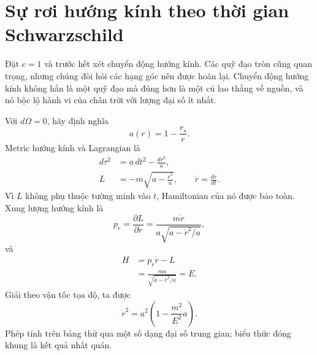 \section{Sự rơi hướng kính theo thời gian Schwarzschild}

Đặt \(c=1\) và trước hết xét chuyển động hướng kính. Các quỹ đạo tròn cũng quan trọng, nhưng chúng đòi hỏi các hạng góc nên được hoãn lại. Chuyển động hướng kính không hẳn là một quỹ đạo mà đúng hơn là một cú lao thẳng về nguồn, và nó bộc lộ hành vi của chân trời với lượng đại số ít nhất.

\begin{classroomqa}
\end{classroomqa}

Với \(d\Omega=0\), hãy định nghĩa
\begin{equation}
a(r)=1-\frac{r_s}{r}.
\label{eq:l5-a-def}
\end{equation}
Metric hướng kính và Lagrangian là
\begin{align}
d\tau^2&=a\,dt^2-\frac{dr^2}{a},\\
L&=-m\sqrt{a-\frac{\dot r^2}{a}},
\qquad
\dot r=\frac{dr}{dt}.
\label{eq:l5-radial-lagrangian}
\end{align}
Vì \(L\) không phụ thuộc tường minh vào \(t\), Hamiltonian của nó được bảo toàn.
Xung lượng hướng kính là
\begin{equation}
p_r=\frac{\partial L}{\partial\dot r}
=\frac{m\dot r}{a\sqrt{a-\dot r^2/a}},
\label{eq:l5-radial-momentum}
\end{equation}
và
\begin{align}
H
&=p_r\dot r-L\\
&=\frac{ma}{\sqrt{a-\dot r^2/a}}
=E.
\label{eq:l5-radial-energy}
\end{align}
Giải theo vận tốc tọa độ, ta được
\begin{equation}
\boxed{
\dot r^2
=a^2\left(1-\frac{m^2}{E^2}a\right).
}
\label{eq:l5-radial-velocity}
\end{equation}
Phép tính trên bảng thử qua một số dạng đại số trung gian; biểu thức đóng khung là kết quả nhất quán.

